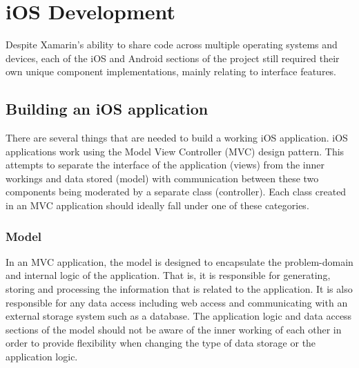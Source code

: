\documentclass[main.tex]{subfiles}
\begin{document}
\section{iOS Development}

Despite Xamarin's ability to share code across multiple operating systems and devices, each of the iOS and Android sections of the project still required their own unique component implementations, mainly relating to interface features.



\subsection{Building an iOS application}

There are several things that are needed to build a working iOS application. iOS applications work using the Model View Controller (MVC) design pattern. This attempts to separate the interface of the application (views) from the inner workings and data stored (model) with communication between these two components being moderated by a separate class (controller). Each class created in an MVC application should ideally fall under one of these categories. 

\subsubsection{Model}

In an MVC application, the model is designed to encapsulate the problem-domain and internal logic of the application. That is, it is responsible for generating, storing and processing the information that is related to the application. It is also responsible for any data access including web access and communicating with an external storage system such as a database. The application logic and data access sections of the model should not be aware of the inner working of each other in order to provide flexibility when changing the type of data storage or the application logic. 
\end{document}
